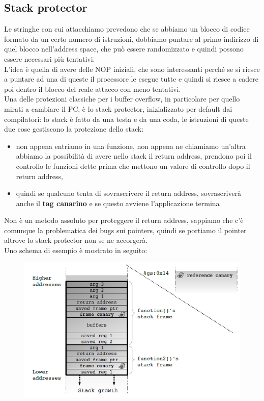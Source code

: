 \documentclass[12pt, oneside]{extbook}
\begin{document}
\subsection{Stack protector}
Le stringhe con cui attacchiamo prevedono che se abbiamo un blocco di codice formato da un certo numero di istruzioni, dobbiamo puntare al primo indirizzo di quel blocco nell'address space, che può essere randomizzato e quindi possono essere necessari più tentativi.\\L'idea è quella di avere delle NOP iniziali, che sono interessanti perché se si riesce a puntare ad una di queste il processore le esegue tutte e quindi si riesce a cadere poi dentro il blocco del reale attacco con meno tentativi.\\Una delle protezioni classiche per i buffer overflow, in particolare per quello mirati a cambiare il PC, è lo stack protector, inizializzato per default dai compilatori: lo stack è fatto da una testa e da una coda, le istruzioni di queste due cose gestiscono la protezione dello stack:
\begin{itemize}
	\item non appena entriamo in una funzione, non appena ne chiamiamo un'altra abbiamo la possibilità di avere nello stack il return address, prendono poi il controllo le funzioni dette prima che mettono un valore di controllo dopo il return address, 
	\item quindi se qualcuno tenta di sovrascrivere il return address, sovrascriverà anche il \textbf{\textsf{tag canarino}} e se questo avviene l'applicazione termina
\end{itemize}
Non è un metodo assoluto per proteggere il return address, sappiamo che c'è comunque la problematica dei bugs sui pointers, quindi se portiamo il pointer altrove lo stack protector non se ne accorgerà.\\Uno schema di esempio è mostrato in seguito:
\begin{figure}[!h]
	\includegraphics[scale=0.5]{immagini/stack_canaries.png}
\end{figure}
\end{document}

